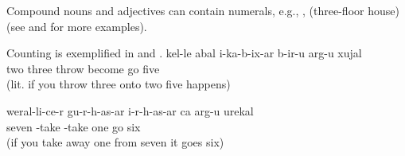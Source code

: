 Compound nouns and adjectives can contain numerals, e.g.,   ,  (three-floor house)  (see  and  for more examples).

Counting is exemplified in  and .
%
\ea\label{ex:twoplusthreeequalsfive}
\gll	k{\ej}{\lab}el-le	{\eppl}a{\pha}bal	{\paaf}i-ka-b-ix-ar	b-ir{\uvfr}{\lab}-u	arg-u	xujal\\
	two three	throw	become go five\\
\glt	{} (lit. if you throw three onto two five happens)
\z

\ea\label{ex:sevenminusoneequalssix}
\gll	weral-li-c{\lmk}e-r	gu-r-h-as{\lmk}-ar	{\paaf}i-r-h-as{\lmk}-ar	ca	arg-u	urek{\lmk}al\\
	seven	-take	-take	one	go	six\\
\glt	{} (if you take away one from seven it goes six)
\z

